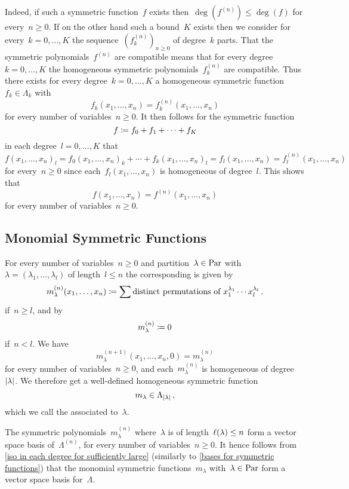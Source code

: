 \documentclass[a4paper, 11pt, twoside=semi]{scrartcl}
\begin{document}
Indeed, if such a symmetric function~$f$ exists then~$\deg( f^{(n)} ) \leq \deg(f)$ for every~$n \geq 0$.
If on the other hand such a bound~$K$ exists then we consider for every~$k = 0, \dotsc, K$ the sequence~$( f^{(n)}_k )_{n \geq 0}$ of degree~$k$ parts.
That the symmetric polynomials~$f^{(n)}$ are compatible means that for every degree~$k = 0, \dotsc, K$ the homogeneous symmetric polynomials~$f^{(n)}_k$ are compatible.
Thus there exists for every degree~$k = 0, \dotsc, K$ a homogeneous symmetric function~$f_k \in \Lambda_k$ with
\[
f_k(x_1, \dots, x_n)
=
f^{(n)}_k(x_1, \dotsc, x_n)
\]
for every number of variables~$n \geq 0$.
It then follows for the symmetric function
\[
f
\coloneqq
f_0 + f_1 + \dotsb + f_K
\]
in each degree~$l = 0, \dotsc, K$ that
\[
f(x_1, \dotsc, x_n)_l
=
f_0(x_1, \dotsc, x_n)_k
+
\dotsb
+
f_k(x_1, \dotsc, x_n)_l
=
f_l(x_1, \dotsc, x_n)
=
f^{(n)}_l(x_1, \dotsc, x_n)
\]
for every~$n \geq 0$ since each~$f_l(x_1, \dotsc, x_n)$ is homogeneous of degree~$l$.
This shows that
\[
f(x_1, \dotsc, x_n)
=
f^{(n)}(x_1, \dotsc, x_n)
\]
for every number of variables~$n \geq 0$.



\subsection{Monomial Symmetric Functions}
\label{monomial symmetric functions}

For every number of variables~$n \geq 0$ and partition~$\lambda \in \mathrm{Par}$ with~$\lambda = (\lambda_1, \dotsc, \lambda_l)$ of length~$l \leq n$ the corresponding  is given by
\[
  m^{(n)}_\lambda(x_1, \dotsc, x_n)
  \coloneqq
  \sum \text{distinct permutations of~$x_1^{\lambda_1} \dotsm x_l^{\lambda_l}$} \,.
\]
if~$n \geq l$, and by
\[
  m^{(n)}_\lambda
  \coloneqq
  0
\]
if~$n < l$.
We have
\[
  m^{(n+1)}_\lambda(x_1, \dotsc, x_n, 0)
  =
  m^{(n)}_\lambda
\]
for every number of variables~$n \geq 0$, and each~$m_\lambda^{(n)}$ is homogeneous of degree~$\lvert\lambda\rvert$.
We therefore get a well-defined homogeneous symmetric function
\[
  m_\lambda
  \in
  \Lambda_{\lvert\lambda\rvert} \,,
\]
which we call the  associated to~$\lambda$.

The symmetric polynomials~$m^{(n)}_\lambda$ where~$\lambda$ is of length~$\ell(\lambda) \leq n$ form a vector space basis of~$\Lambda^{(n)}$, for every number of variables~$n \geq 0$.
It hence follows from \cref{iso in each degree for sufficiently large} (similarly to \cref{bases for symmetric functions}) that the monomial symmetric functions~$m_\lambda$ with~$\lambda \in \mathrm{Par}$ form a vector space basis for~$\Lambda$.
\end{document}
